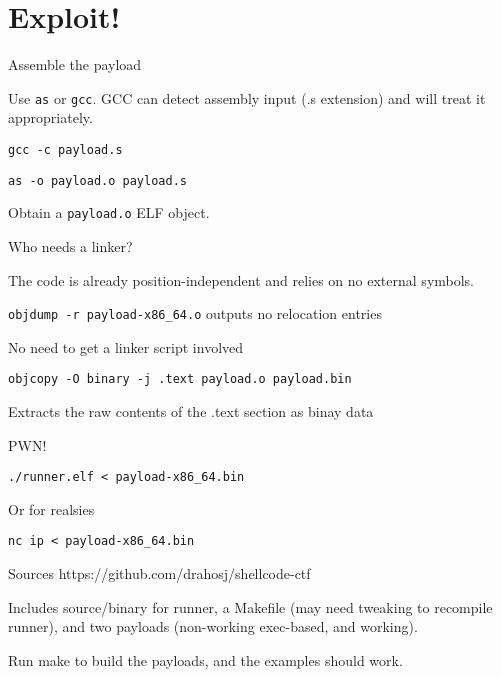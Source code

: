 \documentclass{beamer}
\begin{document}
\section{Exploit!}

\begin{frame}
 {Assemble the payload}
 
 Use {\tt as} or {\tt gcc}.
 GCC can detect assembly input (.s extension) and will treat it appropriately.
 
 \pause
 
 {\tt gcc -c payload.s}
 
 {\tt as -o payload.o payload.s}
 
 Obtain a {\tt payload.o} ELF object.
\end{frame}

\begin{frame}
 {Who needs a linker?}
 
 The code is already position-independent and relies on no external symbols.
 
 {\tt objdump -r payload-x86\_64.o} outputs no relocation entries
 
 No need to get a linker script involved
 
 {\tt objcopy -O binary -j .text payload.o payload.bin }
 
 Extracts the raw contents of the .text section as binay data
\end{frame}

\begin{frame}
 {PWN!}
 
 {\tt ./runner.elf < payload-x86\_64.bin }
 
 Or for realsies
 
 {\tt nc ip < payload-x86\_64.bin }
\end{frame}

\begin{frame}
 {Sources}
 https://github.com/drahosj/shellcode-ctf 
 
 Includes source/binary for runner, a Makefile (may need tweaking to recompile runner),
 and two payloads (non-working exec-based, and working).
 
 Run make to build the payloads, and the examples should work.
\end{frame}
\end{document}
